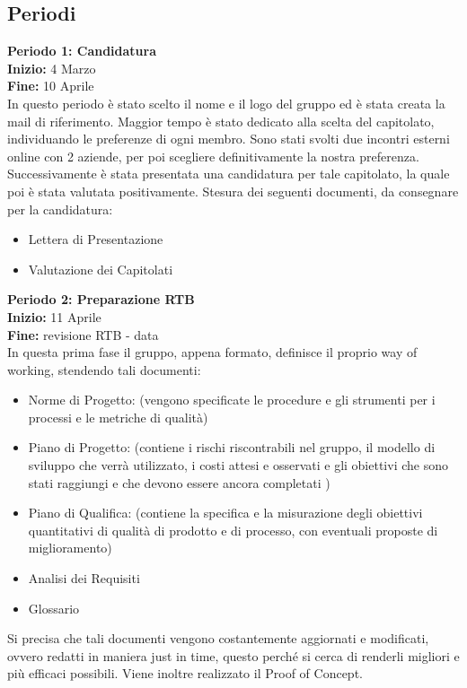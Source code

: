 \subsection*{Periodi} 
{    
    \textbf{Periodo 1: Candidatura} \\
    \textbf{Inizio:} 4 Marzo \\
    \textbf{Fine:} 10 Aprile \\
    In questo periodo è stato scelto il nome e il logo del gruppo ed è stata creata la mail di riferimento. 
    Maggior tempo è stato dedicato alla scelta del capitolato, individuando le preferenze di ogni membro. 
    Sono stati svolti due incontri esterni online con 2 aziende, per poi scegliere definitivamente la nostra preferenza. 
    Successivamente è stata presentata una candidatura per tale capitolato, la quale poi è stata valutata positivamente.
    Stesura dei seguenti documenti, da consegnare per la candidatura:
    \begin{itemize}
        \item Lettera di Presentazione
        \item Valutazione dei Capitolati
    \end{itemize} 
    \textbf{Periodo 2: Preparazione RTB} \\
    \textbf{Inizio:} 11 Aprile \\
    \textbf{Fine:} revisione RTB - data \\
    In questa prima fase il gruppo, appena formato, definisce il proprio way of working, stendendo tali documenti:
    \begin{itemize} 
        \item Norme di Progetto: (vengono specificate le procedure e gli strumenti per i processi e le metriche di qualità)
        \item Piano di Progetto: (contiene i rischi riscontrabili nel gruppo, il modello di sviluppo che verrà utilizzato, i costi attesi e osservati e gli obiettivi che sono stati raggiungi e che devono essere ancora completati )
        \item Piano di Qualifica: (contiene la specifica e la misurazione degli obiettivi quantitativi di qualità di prodotto e di processo, con eventuali proposte di miglioramento)
        \item Analisi dei Requisiti
        \item Glossario
    \end{itemize} 
    Si precisa che tali documenti vengono costantemente aggiornati e modificati, ovvero redatti in maniera just in time, 
    questo perché si cerca di renderli migliori e più efficaci possibili. 
    Viene inoltre realizzato il Proof of Concept.
}
